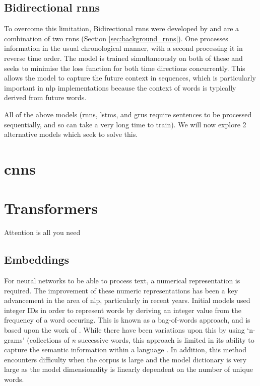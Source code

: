 \subsection{Bidirectional \acrlong{rnn}s}
\label{sec:background_bidirectional_rnns}
To overcome this limitation, Bidirectional \acrshort{rnn}s were developed by \citet{Schuster} and are a combination of two \acrshort{rnn}s (Section \ref{sec:background_rnns}). One processes information in the usual chronological manner, with a second processing it in reverse time order. The model is trained simultaneously on both of these and seeks to minimise the loss function for both time directions concurrently. This allows the model to capture the future context in sequences, which is particularly important in \acrshort{nlp} implementations because the context of words is typically derived from future words.

All of the above models (\acrshort{rnn}s, \acrshort{lstm}s, and \acrshort{gru}s require sentences to be processed sequentially, and so can take a very long time to train). We will now explore 2 alternative models which seek to solve this.

\section{\acrlong{cnn}s}
\label{sec:background_cnns}


\section{Transformers}
\label{sec:background_transformers}
Attention is all you need

\subsection{Embeddings}
For neural networks to be able to process text, a numerical representation is required. The improvement of these numeric representations has been a key advancement in the area of \acrfull{nlp}, particularly in recent years. Initial models used integer IDs in order to represent words by deriving an integer value from the frequency of a word occuring. This is known as a bag-of-words approach, and is based upon the work of \citet{Zellig}. While there have been variations upon this by using `n-grams' (collections of \textit{n} successive words, this approach is limited in its ability to capture the semantic information within a language \citep{Monisha}. In addition, this method encounters difficulty when the corpus is large and the model dictionary is very large as the model dimensionality is linearly dependent on the number of unique words.

